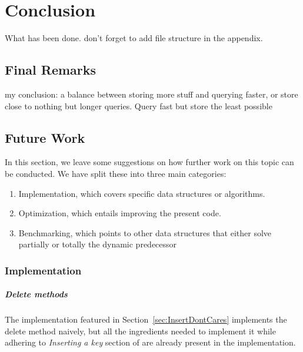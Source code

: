 \chapter{Conclusion} \label{sec:conclusionChapter}

What has been done. don't forget to add file structure in the appendix.

\section{Final Remarks}

my conclusion: a balance between storing more stuff and querying faster, or store close to nothing but longer queries. Query fast but store the least possible

\section{Future Work} \label{sec:futureWork}
In this section, we leave some suggestions on how further work on this topic can be conducted. We have split these into three main categories:
\begin{enumerate}
    \item
    Implementation, which covers specific data structures or algorithms.
    
    \item
    Optimization, which entails improving the present code.
    
    \item
    Benchmarking, which points to other data structures that either solve partially or totally the dynamic predecessor 
    
\end{enumerate}

\subsection{Implementation} \label{sec:FutureWorkImplementation}

\paragraph*{Delete methods}
The implementation featured in Section~\ref{sec:InsertDontCares} implements the {\ttfamily delete} method naively, but all the ingredients needed to implement it while adhering to \textit{Inserting a key} section of \cite{patrascu2014dynamic} are already present in the implementation.


